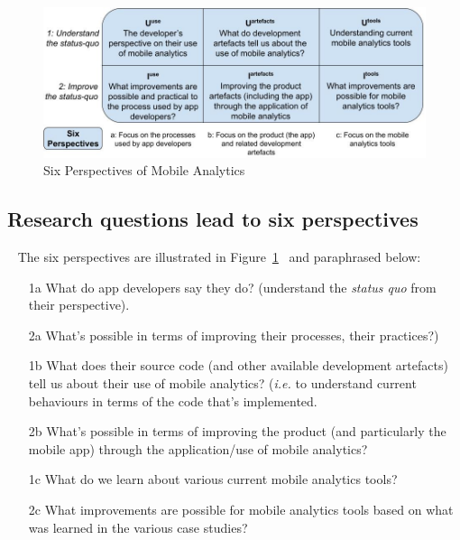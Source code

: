 \begin{figure}
    \includegraphics[width=\linewidth]{images/my/six-perspectives-2x3-matrix-12-nov-2021.jpeg}
    \caption{Six Perspectives of Mobile Analytics}
    \label{fig:six-perspectives-in-the-research-questions-section}
\end{figure}

\subsection{Research questions lead to six perspectives}~\label{rq-leads-to-six-perspectives}
The six perspectives are illustrated in Figure~\ref{fig:six-perspectives-in-the-research-questions-section}~ and paraphrased below:

\begin{enumerate}
    \item [1a] What do app developers say they do? (understand the \emph{status quo} from their perspective).
    \item [2a] What's possible in terms of improving their processes, their practices?)
    \item [1b] What does their source code (and other available development artefacts) tell us about their use of mobile analytics? (\emph{i.e.} to understand current behaviours in terms of the code that's implemented.
    \item [2b] What's possible in terms of improving the product (and particularly the mobile app) through the application/use of mobile analytics?
    \item [1c] What do we learn about various current mobile analytics tools?
    \item [2c] What improvements are possible for mobile analytics tools based on what was learned in the various case studies?
\end{enumerate}

